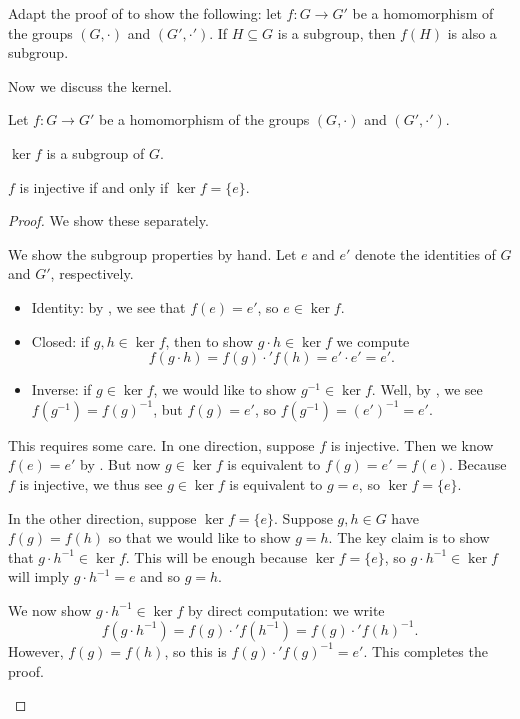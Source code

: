 \documentclass[../notes.tex]{subfiles}
\begin{document}
\begin{exe}
    Adapt the proof of  to show the following: let $f\colon G\to G'$ be a homomorphism of the groups $(G,\cdot)$ and $(G',\cdot')$. If $H\subseteq G$ is a subgroup, then $f(H)$ is also a subgroup.
\end{exe}
Now we discuss the kernel.
\begin{lemma} \label{lem:ker-subgroup}
    Let $f\colon G\to G'$ be a homomorphism of the groups $(G,\cdot)$ and $(G',\cdot')$.
    \begin{listalph}
        \item $\ker f$ is a subgroup of $G$.
        \item $f$ is injective if and only if $\ker f=\{e\}$.
    \end{listalph}
\end{lemma}
\begin{proof}
    We show these separately.
    \begin{listalph}
        \item We show the subgroup properties by hand. Let $e$ and $e'$ denote the identities of $G$ and $G'$, respectively.
        \begin{itemize}
            \item Identity: by , we see that $f(e)=e'$, so $e\in\ker f$.
            \item Closed: if $g,h\in\ker f$, then to show $g\cdot h\in\ker f$ we compute
            \[f(g\cdot h)=f(g)\cdot'f(h)=e'\cdot e'=e'.\]
            \item Inverse: if $g\in\ker f$, we would like to show $g^{-1}\in\ker f$. Well, by , we see $f\left(g^{-1}\right)=f(g)^{-1}$, but $f(g)=e'$, so $f\left(g^{-1}\right)=(e')^{-1}=e'$.
        \end{itemize}
        \item This requires some care. In one direction, suppose $f$ is injective. Then we know $f(e)=e'$ by . But now $g\in\ker f$ is equivalent to $f(g)=e'=f(e)$. Because $f$ is injective, we thus see $g\in\ker f$ is equivalent to $g=e$, so $\ker f=\{e\}$.
        
        In the other direction, suppose $\ker f=\{e\}$. Suppose $g,h\in G$ have $f(g)=f(h)$ so that we would like to show $g=h$. The key claim is to show that $g\cdot h^{-1}\in\ker f$. This will be enough because $\ker f=\{e\}$, so $g\cdot h^{-1}\in\ker f$ will imply $g\cdot h^{-1}=e$ and so $g=h$.
        
        We now show $g\cdot h^{-1}\in\ker f$ by direct computation: we write
        \[f\left(g\cdot h^{-1}\right)=f(g)\cdot'f\left(h^{-1}\right)=f(g)\cdot'f(h)^{-1}.\]
        However, $f(g)=f(h)$, so this is $f(g)\cdot'f(g)^{-1}=e'$. This completes the proof.
        \qedhere
    \end{listalph}
\end{proof}
\end{document}
